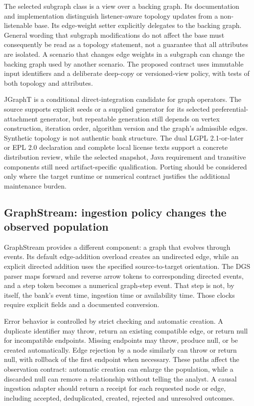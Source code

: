 The selected subgraph class is a view over a backing graph. Its documentation and implementation distinguish listener-aware topology updates from a non-listenable base. Its edge-weight setter explicitly delegates to the backing graph. General wording that subgraph modifications do not affect the base must consequently be read as a topology statement, not a guarantee that all attributes are isolated. A scenario that changes edge weights in a subgraph can change the backing graph used by another scenario. The proposed contract uses immutable input identifiers and a deliberate deep-copy or versioned-view policy, with tests of both topology and attributes.~\citep{exec25_jnet_jgrapht}

JGraphT is a conditional direct-integration candidate for graph operators. The source supports explicit seeds or a supplied generator for its selected preferential-attachment generator, but repeatable generation still depends on vertex construction, iteration order, algorithm version and the graph's admissible edges. Synthetic topology is not authentic bank structure. The dual LGPL 2.1-or-later or EPL 2.0 declaration and complete local license texts support a concrete distribution review, while the selected snapshot, Java requirement and transitive components still need artifact-specific qualification. Porting should be considered only where the target runtime or numerical contract justifies the additional maintenance burden.~\citep{exec25_jnet_jgrapht,exec25_jnet_choice}

\subsection{GraphStream: ingestion policy changes the observed population}

GraphStream provides a different component: a graph that evolves through events. Its default edge-addition overload creates an undirected edge, while an explicit directed addition uses the specified source-to-target orientation. The DGS parser maps forward and reverse arrow tokens to corresponding directed events, and a step token becomes a numerical graph-step event. That step is not, by itself, the bank's event time, ingestion time or availability time. Those clocks require explicit fields and a documented conversion.~\citep{exec25_jnet_graphstream}

Error behavior is controlled by strict checking and automatic creation. A duplicate identifier may throw, return an existing compatible edge, or return null for incompatible endpoints. Missing endpoints may throw, produce null, or be created automatically. Edge rejection by a node similarly can throw or return null, with rollback of the first endpoint when necessary. These paths affect the observation contract: automatic creation can enlarge the population, while a discarded null can remove a relationship without telling the analyst. A causal ingestion adapter should return a receipt for each requested node or edge, including accepted, deduplicated, created, rejected and unresolved outcomes.~\citep{exec25_jnet_graphstream}

